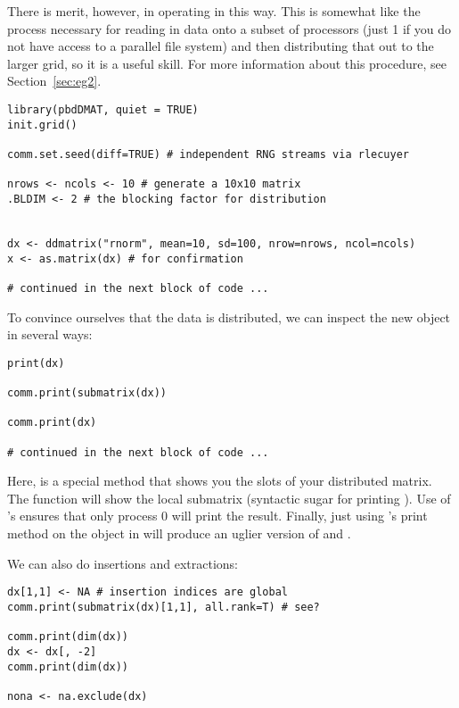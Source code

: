 There is merit, however, in operating in this way.  This is somewhat like the process necessary for reading in data onto a subset of processors (just 1 if you do not have access to a parallel file system) and then distributing that out to the larger grid, so it is a useful skill.  For more information about this procedure, see Section~\ref{sec:eg2}.

\begin{lstlisting}[language=rr,title=Generating Test Data]
library(pbdDMAT, quiet = TRUE)
init.grid()

comm.set.seed(diff=TRUE) # independent RNG streams via rlecuyer

nrows <- ncols <- 10 # generate a 10x10 matrix
.BLDIM <- 2 # the blocking factor for distribution


dx <- ddmatrix("rnorm", mean=10, sd=100, nrow=nrows, ncol=ncols)
x <- as.matrix(dx) # for confirmation

# continued in the next block of code ...
\end{lstlisting}

To convince ourselves that the data is distributed, we can inspect the new object in several ways:

\begin{lstlisting}[language=rr,title=Printing the Object]
print(dx)

comm.print(submatrix(dx))

comm.print(dx)
 
# continued in the next block of code ...
\end{lstlisting}

Here,  is a special method that shows you the slots of your distributed matrix.  The  function will show the local submatrix (syntactic sugar for printing ).  Use of 's  ensures that only process 0 will print the result.  Finally, just using 's print method on the object in  will produce an uglier version of  and .

We can also do insertions and extractions:

\begin{lstlisting}[language=rr,title=Insertion and Extraction]
dx[1,1] <- NA # insertion indices are global
comm.print(submatrix(dx)[1,1], all.rank=T) # see?

comm.print(dim(dx))
dx <- dx[, -2]
comm.print(dim(dx))

nona <- na.exclude(dx)
\end{lstlisting}

